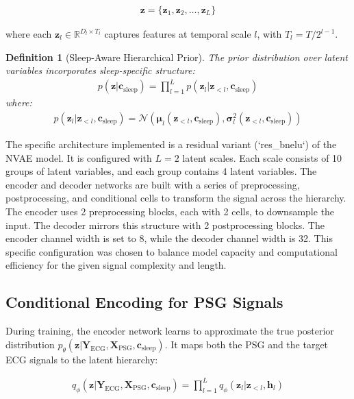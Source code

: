 \documentclass[11pt,en]{elegantpaper}
\newtheorem{definition}{Definition}
\begin{document}
\begin{align}
\mathbf{z} = \{\mathbf{z}_1, \mathbf{z}_2, \ldots, \mathbf{z}_L\}
\end{align}

where each $\mathbf{z}_l \in \mathbb{R}^{D_l \times T_l}$ captures features at temporal scale $l$, with $T_l = T / 2^{l-1}$.

\begin{definition}[Sleep-Aware Hierarchical Prior]
The prior distribution over latent variables incorporates sleep-specific structure:
\begin{align}
p(\mathbf{z} | \mathbf{c}_{\text{sleep}}) = \prod_{l=1}^L p(\mathbf{z}_l | \mathbf{z}_{<l}, \mathbf{c}_{\text{sleep}})
\end{align}
where:
\begin{align}
p(\mathbf{z}_l | \mathbf{z}_{<l}, \mathbf{c}_{\text{sleep}}) = \mathcal{N}(\boldsymbol{\mu}_l(\mathbf{z}_{<l}, \mathbf{c}_{\text{sleep}}), \boldsymbol{\sigma}_l^2(\mathbf{z}_{<l}, \mathbf{c}_{\text{sleep}}))
\end{align}
\end{definition}

The specific architecture implemented is a residual variant (`res_bnelu`) of the NVAE model. It is configured with $L=2$ latent scales. Each scale consists of 10 groups of latent variables, and each group contains 4 latent variables. The encoder and decoder networks are built with a series of preprocessing, postprocessing, and conditional cells to transform the signal across the hierarchy. The encoder uses 2 preprocessing blocks, each with 2 cells, to downsample the input. The decoder mirrors this structure with 2 postprocessing blocks. The encoder channel width is set to 8, while the decoder channel width is 32. This specific configuration was chosen to balance model capacity and computational efficiency for the given signal complexity and length.

\subsection{Conditional Encoding for PSG Signals}

During training, the encoder network learns to approximate the true posterior distribution $p_\theta(\mathbf{z} | \mathbf{Y}_{\text{ECG}}, \mathbf{X}_{\text{PSG}}, \mathbf{c}_{\text{sleep}})$. It maps both the PSG and the target ECG signals to the latent hierarchy:

\begin{align}
q_\phi(\mathbf{z} | \mathbf{Y}_{\text{ECG}}, \mathbf{X}_{\text{PSG}}, \mathbf{c}_{\text{sleep}}) = \prod_{l=1}^L q_\phi(\mathbf{z}_l | \mathbf{z}_{<l}, \mathbf{h}_l)
\end{align}
\end{document}
